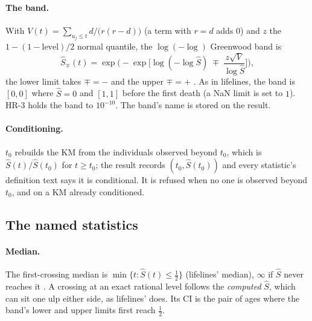 \paragraph{The band.} With $V(t)=\sum_{u_j\le t} d/\big(r(r-d)\big)$ (a term with $r=d$ adds $0$) and $z$ the
$1-(1-\text{level})/2$ normal quantile, the $\log(-\log)$ Greenwood band is
\begin{equation}\label{eq:surv-band}
  \hat S_{\mp}(t)=\exp\!\Big(-\exp\!\Big[\log(-\log\hat S)\;\mp\;\frac{z\sqrt{V}}{\log\hat S}\Big]\Big),
\end{equation}
the lower limit takes $\mp=-$ and the upper $\mp=+$ . As in lifelines,
the band is $[0,0]$ where $\hat S=0$ and $[1,1]$ before the first death (a NaN limit is set to $1$). HR-3 holds the
band to $10^{-10}$. The band's name  is stored on the result.

\paragraph{Conditioning.} $t_0$ rebuilds the KM from the individuals observed beyond $t_0$, which
is $\hat S(t)/\hat S(t_0)$ for $t\ge t_0$; the result records $(t_0,\hat S(t_0))$ and every statistic's definition
text says it is conditional. It is refused when no one is observed beyond $t_0$, and on a KM already conditioned.

\subsection{The named statistics}\label{sec:surv-stats}

\paragraph{Median.} The first-crossing median is $\min\{t:\hat S(t)\le\tfrac12\}$ (lifelines' median), $\infty$ if
$\hat S$ never reaches it . A crossing at an exact rational level follows the \emph{computed}
$\hat S$, which can sit one ulp either side, as lifelines' does. Its CI is the pair of ages where the band's lower and
upper limits first reach $\tfrac12$.


